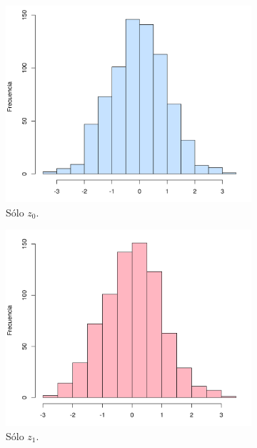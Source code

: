 \documentclass[12pt]{article}
\begin{document}
	\begin{figure}
		\begin{subfigure}{\textwidth}
			\centering
			\includegraphics[scale=0.45]{normalz0.png}
			\caption{Sólo $z_0$.}
		\end{subfigure}
		\begin{subfigure}{\textwidth}
			\centering
			\includegraphics[scale=0.45]{normalz1.png}
			\caption{Sólo $z_1$.}
		\end{subfigure}
		\begin{subfigure}{\textwidth}
			\centering

\end{subfigure}
\end{figure}
\end{document}
